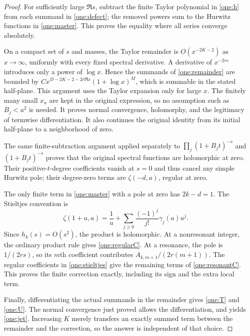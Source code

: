 \begin{proof}
For sufficiently large $\Re s$, subtract the finite Taylor polynomial
in \eqref{one:h} from each summand in \eqref{one:defect}; the removed
powers sum to the Hurwitz functions in \eqref{one:master}.  This proves
the equality where all series converge absolutely.

On a compact set of $s$ and masses, the Taylor remainder is
$O(x^{-2K-2})$ as $x\to\infty$, uniformly with every fixed spectral
derivative.  A derivative of $x^{-2rs}$ introduces only a power of
$\log x$.  Hence the summands of \eqref{one:remainder} are bounded
by $C x^{D-2K-2-2r\Re s}(1+\log x)^M$, which is summable in the
stated half-plane.  This argument uses the Taylor expansion only for
large $x$.  The finitely many small $x_n$ are kept in the original
expression, so no assumption such as $B_j<a^2$ is needed.
It proves normal convergence, holomorphy, and the legitimacy of
termwise differentiation.  It also continues the original identity
from its initial half-plane to a neighborhood of zero.

The same finite-subtraction argument applied separately to
$\prod_j(1+B_jt)^{-s}$ and $(1+B_jt)^{-s}$ proves that the original
spectral functions are holomorphic at zero.  Their positive-$t$-degree
coefficients vanish at $s=0$ and thus cancel any simple Hurwitz pole;
their degree-zero terms are $\zeta(-d,a)$, regular at zero.

The only finite term in \eqref{one:master} with a pole at zero has
$2k-d=1$.  The Stieltjes convention is
\begin{equation}\label{one:stieltjes}
 \zeta(1+u,a)=\frac1u+
                 \sum_{j\ge0}\frac{(-1)^j}{j!}\gamma_j(a)u^j.
\end{equation}
Since $h_k(s)=O(s^2)$, the product is holomorphic.  At a nonresonant
integer, the ordinary product rule gives \eqref{one:regularC}.
At a resonance, the pole is $1/(2rs)$, so its $m$th coefficient
contributes $A_{k,m+1}/(2r(m+1))$.  The regular coefficients in
\eqref{one:stieltjes} give the remaining terms of
\eqref{one:resonantC}.  This proves the finite correction exactly,
including its sign and the extra local term.

Finally, differentiating the actual summands in the remainder gives
\eqref{one:T} and \eqref{one:U}.  The normal convergence just proved
allows the differentiation, and yields \eqref{one:jet}.  Increasing
$K$ merely transfers an exactly summed term between the remainder
and the correction, so the answer is independent of that choice.
\end{proof}

